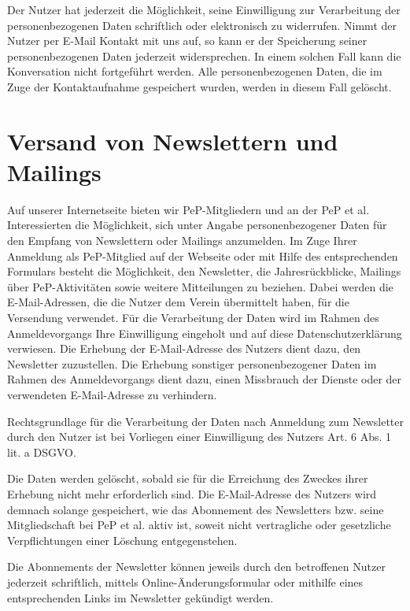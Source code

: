 \documentclass[
  fontsize=12pt,
  paper=a4,
  DIV14,
  parskip,
]{scrartcl}
\begin{document}
Der Nutzer hat jederzeit die Möglichkeit, seine Einwilligung zur Verarbeitung
der personenbezogenen Daten schriftlich oder elektronisch zu widerrufen.
Nimmt der Nutzer per E-Mail Kontakt mit uns auf, so kann er der Speicherung
seiner personenbezogenen Daten jederzeit widersprechen.
In einem solchen Fall kann die Konversation nicht fortgeführt werden.
Alle personenbezogenen Daten, die im Zuge der Kontaktaufnahme gespeichert
wurden, werden in diesem Fall gelöscht.

\section{Versand von Newslettern und Mailings}

Auf unserer Internetseite bieten wir PeP-Mitgliedern und an der PeP et al.
Interessierten die Möglichkeit, sich unter Angabe personenbezogener Daten für
den Empfang von Newslettern oder Mailings anzumelden.
Im Zuge Ihrer Anmeldung als PeP-Mitglied auf der Webseite oder mit Hilfe des
entsprechenden Formulars besteht die Möglichkeit, den Newsletter, die
Jahresrückblicke, Mailings über PeP-Aktivitäten sowie weitere Mitteilungen zu
beziehen.
Dabei werden die E-Mail-Adressen, die die Nutzer dem Verein übermittelt
haben, für die Versendung verwendet. Für die Verarbeitung der Daten wird im
Rahmen des Anmeldevorgangs Ihre Einwilligung eingeholt und auf diese
Datenschutzerklärung verwiesen.
Die Erhebung der E-Mail-Adresse des Nutzers dient dazu, den Newsletter
zuzustellen. Die Erhebung sonstiger personenbezogener Daten im Rahmen des
Anmeldevorgangs dient dazu, einen Missbrauch der Dienste oder der verwendeten
E-Mail-Adresse zu verhindern.

Rechtsgrundlage für die Verarbeitung der Daten nach Anmeldung zum Newsletter
durch den Nutzer ist bei Vorliegen einer Einwilligung des Nutzers Art. 6 Abs.
1 lit. a DSGVO.

Die Daten werden gelöscht, sobald sie für die Erreichung des Zweckes ihrer
Erhebung nicht mehr erforderlich sind. Die E-Mail-Adresse des Nutzers wird
demnach solange gespeichert, wie das Abonnement des Newsletters bzw. seine
Mitgliedschaft bei PeP et al. aktiv ist, soweit nicht vertragliche oder
gesetzliche Verpflichtungen einer Löschung entgegenstehen.

Die Abonnements der Newsletter können jeweils durch den betroffenen Nutzer
jederzeit schriftlich, mittels Online-Änderungsformular oder mithilfe eines entsprechenden Links im Newsletter gekündigt werden.
\end{document}
